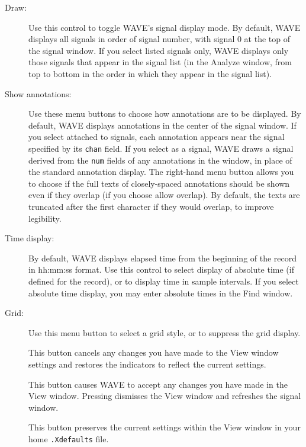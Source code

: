\documentclass[twoside]{book}
\newcommand{\keycap}[1]{\cornersize{.5}\Ovalbox{\small\sf #1}}
\newcommand{\button}[1]{\cornersize{2}\ovalbox{\rule[-.3mm]{0cm}{2.5mm}\small\sf ~#1~}}
\newcommand{\amenubutton}[1]{{\sf #1}~\keycap{\ensuremath{\nabla}}}
\newcommand{\WAVE}{{\sf WAVE}\xspace}
\begin{document}
\begin{description}

\item[\amenubutton{Draw:}]
Use this control to toggle \WAVE{}'s signal display mode.  By default,
\WAVE{} displays all signals in order of signal number, with signal 0 at the
top of the signal window.  If you select {\sf listed signals only}, \WAVE{}
displays only those signals that appear in the signal list (in the {\sf
Analyze} window, from top to bottom in the order in which they appear
in the signal list).

\item[\amenubutton{Show annotations:}]
Use these menu buttons to choose how annotations are to be displayed.  By
default, \WAVE{} displays annotations in the center of the signal window.
If you select {\sf attached to signals}, each annotation appears near the
signal specified by its {\tt chan} field.  If you select {\sf as a signal},
\WAVE{} draws a signal derived from the {\tt num} fields of any annotations
in the window, in place of the standard annotation display.  The right-hand
menu button allows you to choose if the full texts of closely-spaced
annotations should be shown even if they overlap (if you choose {\sf allow
overlap}).  By default, the texts are truncated after the first character if
they would overlap, to improve legibility.

\item[\amenubutton{Time display:}]
By default, \WAVE{} displays elapsed time from the beginning of the record
in {\sf hh:mm:ss} format.  Use this control to select display of absolute time
(if defined for the record), or to display time in sample intervals.  If you
select absolute time display, you may enter absolute times in the {\sf Find}
window.

\item[\amenubutton{Grid:}]
Use this menu button to select a grid style, or to suppress the grid display.

\item[\button{Undo changes}]
This button cancels any changes you have made to the {\sf View} window
settings and restores the indicators to reflect the current settings.

\item[\button{Redraw}]
This button causes \WAVE{} to accept any changes you have made in the {\sf
View} window.  Pressing \button{Redraw} dismisses the {\sf View} window and
refreshes the signal window.

\item[\button{Save as new defaults}]
This button preserves the current settings within the {\sf View}
window in your home {\tt .Xdefaults} file.

\end{description}
\end{document}
